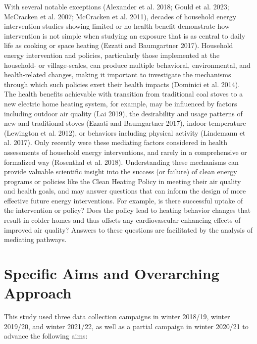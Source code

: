 \documentclass[
  letterpaper,
  DIV=11,
  numbers=noendperiod]{scrartcl}
\begin{document}
With several notable exceptions (Alexander et al. 2018; Gould et al.
2023; McCracken et al. 2007; McCracken et al. 2011), decades of
household energy intervention studies showing limited or no health
benefit demonstrate how intervention is not simple when studying an
exposure that is as central to daily life as cooking or space heating
(Ezzati and Baumgartner 2017). Household energy intervention and
policies, particularly those implemented at the household- or
village-scales, can produce multiple behavioral, environmental, and
health-related changes, making it important to investigate the
mechanisms through which such policies exert their health impacts
(Dominici et al. 2014). The health benefits achievable with transition
from traditional coal stoves to a new electric home heating system, for
example, may be influenced by factors including outdoor air quality (Lai
2019), the desirability and usage patterns of new and traditional stoves
(Ezzati and Baumgartner 2017), indoor temperature (Lewington et al.
2012), or behaviors including physical activity (Lindemann et al. 2017).
Only recently were these mediating factors considered in health
assessments of household energy interventions, and rarely in a
comprehensive or formalized way (Rosenthal et al. 2018). Understanding
these mechanisms can provide valuable scientific insight into the
success (or failure) of clean energy programs or policies like the Clean
Heating Policy in meeting their air quality and health goals, and may
answer questions that can inform the design of more effective future
energy interventions. For example, is there successful uptake of the
intervention or policy? Does the policy lead to heating behavior changes
that result in colder homes and thus offsets any
cardiovascular-enhancing effects of improved air quality? Answers to
these questions are facilitated by the analysis of mediating pathways.

\hypertarget{specific-aims-and-overarching-approach}{%
\section{Specific Aims and Overarching
Approach}\label{specific-aims-and-overarching-approach}}

This study used three data collection campaigns in winter 2018/19,
winter 2019/20, and winter 2021/22, as well as a partial campaign in
winter 2020/21 to advance the following aims:
\end{document}
